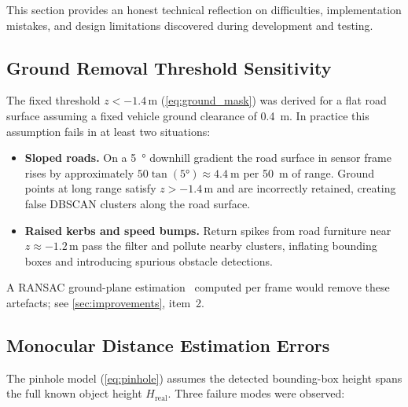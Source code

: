 \documentclass[12pt,a4paper]{article}
\begin{document}
This section provides an honest technical reflection on difficulties,
implementation mistakes, and design limitations discovered during
development and testing.

\subsection{Ground Removal Threshold Sensitivity}

The fixed threshold $z < -1.4$\,m (\cref{eq:ground_mask}) was derived for a
flat road surface assuming a fixed vehicle ground clearance of
\SI{0.4}{\metre}.  In practice this assumption fails in at least two
situations:

\begin{itemize}[nosep]
  \item \textbf{Sloped roads.}  On a \SI{5}{\degree} downhill gradient the
        road surface in sensor frame rises by approximately
        $50\tan(5°) \approx \SI{4.4}{\metre}$ per \SI{50}{\metre} of range.
        Ground points at long range satisfy $z > -1.4$\,m and are incorrectly
        retained, creating false DBSCAN clusters along the road surface.
  \item \textbf{Raised kerbs and speed bumps.}  Return spikes from road
        furniture near $z \approx -1.2$\,m pass the filter and pollute nearby
        clusters, inflating bounding boxes and introducing spurious obstacle
        detections.
\end{itemize}

\noindent
A RANSAC ground-plane estimation~\cite{fischler1981ransac} computed per frame
would remove these artefacts; see \cref{sec:improvements}, item~2.

\subsection{Monocular Distance Estimation Errors}

The pinhole model (\cref{eq:pinhole}) assumes the detected bounding-box height
spans the full known object height $H_\text{real}$.  Three failure modes were
observed:
\end{document}
